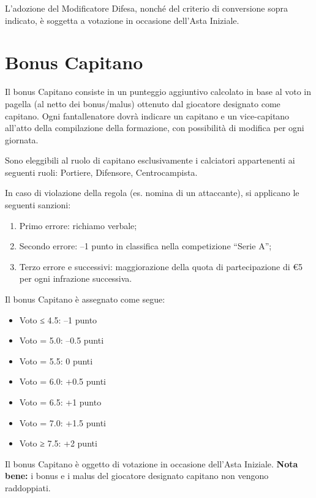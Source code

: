 L'adozione del Modificatore Difesa, nonché del criterio di conversione sopra indicato, è soggetta a votazione in occasione dell'Asta Iniziale.

\section{Bonus Capitano}
\label{art:5.5}

Il bonus Capitano consiste in un punteggio aggiuntivo calcolato in base al voto in pagella (al netto dei bonus/malus) ottenuto dal giocatore designato come capitano. Ogni fantallenatore dovrà indicare un capitano e un vice-capitano all'atto della compilazione della formazione, con possibilità di modifica per ogni giornata.

Sono eleggibili al ruolo di capitano esclusivamente i calciatori appartenenti ai seguenti ruoli: Portiere, Difensore, Centrocampista.

\noindent In caso di violazione della regola (es. nomina di un attaccante), si applicano le seguenti sanzioni:

\begin{enumerate}
    \item Primo errore: richiamo verbale;
    \item Secondo errore: –1 punto in classifica nella competizione “Serie A”;
    \item Terzo errore e successivi: maggiorazione della quota di partecipazione di €5 per ogni infrazione successiva.
\end{enumerate}

\noindent Il bonus Capitano è assegnato come segue:

\begin{itemize}
    \item Voto ≤ 4.5: –1 punto
    \item Voto = 5.0: –0.5 punti
    \item Voto = 5.5: 0 punti
    \item Voto = 6.0: +0.5 punti
    \item Voto = 6.5: +1 punto
    \item Voto = 7.0: +1.5 punti
    \item Voto ≥ 7.5: +2 punti
\end{itemize}

\noindent Il bonus Capitano è oggetto di votazione in occasione dell'Asta Iniziale.  
\textbf{Nota bene:} i bonus e i malus del giocatore designato capitano non vengono raddoppiati.


